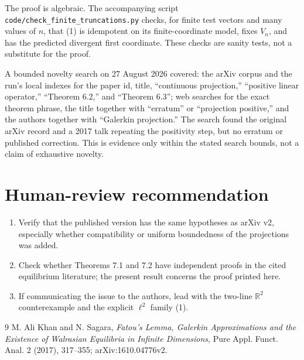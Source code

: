 \documentclass[11pt]{article}
\newcommand{\R}{\mathbb{R}}
\begin{document}
The proof is algebraic.  The accompanying script
\texttt{code/check\_finite\_truncations.py} checks, for finite test vectors and
many values of \(n\), that (1) is idempotent on its finite-coordinate model,
fixes \(V_n\), and has the predicted divergent first coordinate.  These
checks are sanity tests, not a substitute for the proof.

A bounded novelty search on 27 August 2026 covered: the arXiv corpus and the
run's local indexes for the paper id, title, ``continuous projection,''
``positive linear operator,'' ``Theorem 6.2,'' and ``Theorem 6.3''; web
searches for the exact theorem phrase, the title together with ``erratum'' or
``projection positive,'' and the authors together with ``Galerkin
projection.''  The search found the original arXiv record and a 2017 talk
repeating the positivity step, but no erratum or published correction.  This
is evidence only within the stated search bounds, not a claim of exhaustive
novelty.

\section{Human-review recommendation}

\begin{enumerate}[leftmargin=*]
\item Verify that the published version has the same hypotheses as arXiv
      v2, especially whether compatibility or uniform boundedness of the
      projections was added.
\item Check whether Theorems 7.1 and 7.2 have independent proofs in the cited
      equilibrium literature; the present result concerns the proof printed
      here.
\item If communicating the issue to the authors, lead with the two-line
      \(\R^2\) counterexample and the explicit \(\ell^2\) family (1).
\end{enumerate}

\begin{thebibliography}{9}
M. Ali Khan and N. Sagara,
\emph{Fatou's Lemma, Galerkin Approximations and the Existence of Walrasian
Equilibria in Infinite Dimensions}, Pure Appl. Funct. Anal. 2 (2017),
317--355; arXiv:1610.04776v2.
\end{thebibliography}
\end{document}
